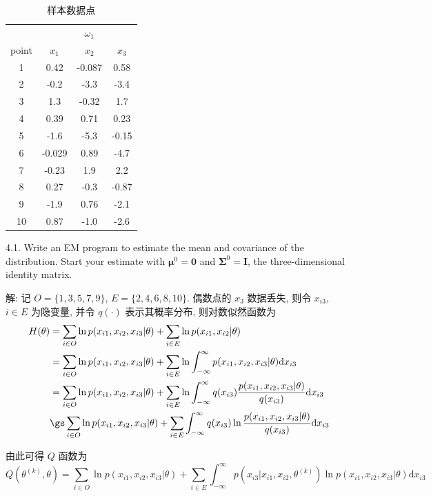 \documentclass[openany]{ctexbook}
\theoremstyle{kaiti}
\theoremstyle{normal}
\begin{document}
\begin{table}[ht]
  \centering
  \caption{样本数据点}
  \label{tab:sampledata}
  \begin{tabular}{c|ccc}
		\hline
		&  &  $\omega_1$ & \\
		point & $x_1$ & $x_2$ & $x_3$ \\
		\hline
		1 & 0.42 & -0.087 & 0.58\\
		2 & -0.2 & -3.3 & -3.4\\
		3 & 1.3 & -0.32 & 1.7\\
		4 & 0.39 & 0.71 & 0.23\\
		5 & -1.6 & -5.3 & -0.15\\
		6 & -0.029 & 0.89 & -4.7\\
		7 & -0.23 & 1.9 & 2.2\\
		8 & 0.27 & -0.3 & -0.87\\
		9 & -1.9 & 0.76 & -2.1\\
		10 & 0.87 & -1.0 & -2.6 \\
		\hline
	\end{tabular}
\end{table}

4.1. Write an EM program to estimate the mean and covariance of the distribution. Start your estimate with $\bm{\mu}^0=\bm{0}$ and $\bm{\Sigma}^0=\bm{I}$, the three-dimensional identity matrix.

解: 记 $O=\{1,3,5,7,9\}$, $E=\{2,4,6,8,10\}$. 偶数点的 $x_3$ 数据丢失, 则令 $x_{i3}$, $i\in E$ 为隐变量, 并令 $q(\cdot)$ 表示其概率分布, 则对数似然函数为
\begin{equation}
  \begin{aligned}
    H(\theta)
    &=\sum_{i\in O}\ln p(x_{i1},x_{i2},x_{i3}|\theta)+\sum_{i\in E}\ln p(x_{i1},x_{i2}|\theta)\\
    &=\sum_{i\in O}\ln p(x_{i1},x_{i2},x_{i3}|\theta)+\sum_{i\in E}\ln\int_{-\infty}^\infty p(x_{i1},x_{i2},x_{i3}|\theta)\mathrm{d}x_{i3}\\
    &=\sum_{i\in O}\ln p(x_{i1},x_{i2},x_{i3}|\theta)+\sum_{i\in E}\ln\int_{-\infty}^\infty q(x_{i3})\frac{p(x_{i1},x_{i2},x_{i3}|\theta)}{q(x_{i3})}\mathrm{d}x_{i3}\\
    &\gs\sum_{i\in O}\ln p(x_{i1},x_{i2},x_{i3}|\theta)+\sum_{i\in E}\int_{-\infty}^\infty q(x_{i3})\ln\frac{p(x_{i1},x_{i2},x_{i3}|\theta)}{q(x_{i3})}\mathrm{d}x_{i3}\\
  \end{aligned}
\end{equation}

由此可得 $Q$ 函数为
\begin{equation}
  Q(\theta^{(k)},\theta)=\sum_{i\in O}\ln p(x_{i1},x_{i2},x_{i3}|\theta)+\sum_{i\in E}\int_{-\infty}^\infty p(x_{i3}|x_{i1},x_{i2},\theta^{(k)})\ln p(x_{i1},x_{i2},x_{i3}|\theta)\mathrm{d}x_{i3}
\end{equation}
\end{document}

